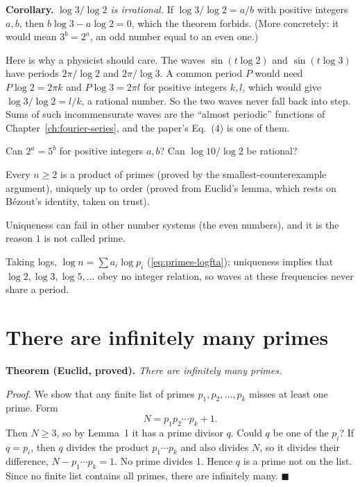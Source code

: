 \textbf{Corollary.} \emph{$\log3/\log2$ is irrational.} If $\log3/\log2=a/b$ with positive integers $a,b$, then $b\log3-a\log2=0$, which the theorem forbids. (More concretely: it would mean $3^b=2^a$, an odd number equal to an even one.)

Here is why a physicist should care. The waves $\sin(t\log2)$ and $\sin(t\log3)$ have periods $2\pi/\log2$ and $2\pi/\log3$. A common period $P$ would need $P\log2=2\pi k$ and $P\log3=2\pi l$ for positive integers $k,l$, which would give $\log3/\log2=l/k$, a rational number. So the two waves never fall back into step. Sums of such incommensurate waves are the ``almost periodic'' functions of Chapter~\ref{ch:fourier-series}, and the paper's Eq.~(4) is one of them.

\begin{checkpoint}
Can $2^a=5^b$ for positive integers $a,b$? Can $\log 10/\log 2$ be rational?
\end{checkpoint}

\begin{keyideas}
\item Every $n\ge2$ is a product of primes (proved by the smallest-counterexample argument), uniquely up to order (proved from Euclid's lemma, which rests on B\'ezout's identity, taken on trust).
\item Uniqueness can fail in other number systems (the even numbers), and it is the reason $1$ is not called prime.
\item Taking logs, $\log n=\sum a_i\log p_i$ (\cref{eq:primes-logfta}); uniqueness implies that $\log2,\log3,\log5,\dots$ obey no integer relation, so waves at these frequencies never share a period.
\end{keyideas}

\section{There are infinitely many primes}\label{sec:primes-euclid}

\textbf{Theorem (Euclid, proved).} \emph{There are infinitely many primes.}

\emph{Proof.} We show that any finite list of primes $p_1,p_2,\dots,p_k$ misses at least one prime. Form
\begin{equation}
N = p_1p_2\cdots p_k + 1 .
\label{eq:primes-euclid}
\end{equation}
Then $N\ge3$, so by Lemma~1 it has a prime divisor $q$. Could $q$ be one of the $p_i$? If $q=p_i$, then $q$ divides the product $p_1\cdots p_k$ and also divides $N$, so it divides their difference, $N-p_1\cdots p_k=1$. No prime divides 1. Hence $q$ is a prime not on the list. Since no finite list contains all primes, there are infinitely many. $\blacksquare$

